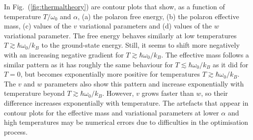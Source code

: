 In Fig.~(\ref{fig:thermaltheory}) are contour plots that show, as a function of temperature $T / \omega_0$ and $\alpha$, (a) the polaron free energy, (b) the polaron effective mass, (c) values of the $v$ variational parameters and (d) values of the $w$ variational parameter. The free energy behaves similarly at low temperatures $T \gtrsim \hbar \omega_0 / k_B$ to the ground-state energy. Still, it seems to shift more negatively with an increasing negative gradient for $T \gtrsim \hbar \omega_0 / k_B$. The effective mass follows a similar pattern as it has roughly the same behaviour for $T \lesssim \hbar \omega_0 / k_B$ as it did for $T = 0$, but becomes exponentially more positive for temperatures $T \gtrsim \hbar \omega_0 / k_B$. The $v$ and $w$ parameters also show this pattern and increase exponentially with temperature beyond $T \gtrsim \hbar \omega_0 / k_B$. However, $v$ grows faster than $w$, so their difference increases exponentially with temperature. The artefacts that appear in contour plots for the effective mass and variational parameters at lower $\alpha$ and high temperatures may be numerical errors due to difficulties in the optimisation process.

